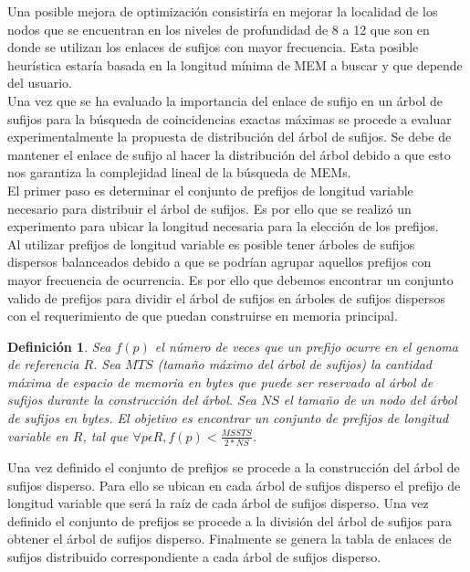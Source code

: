 \documentclass[12pt,a4paper]{article}
\newtheorem{mydef}{Definición}
\begin{document}
\indent
Una posible mejora de optimización consistiría en mejorar la localidad de los nodos que se encuentran en los niveles de profundidad de 8 a 12 que son en donde se utilizan los enlaces de sufijos con mayor frecuencia. Esta posible heurística estaría basada en la longitud mínima de MEM a buscar y que depende del usuario.\\
\indent
Una vez que se ha evaluado la importancia del enlace de sufijo en un árbol de sufijos para la búsqueda de coincidencias exactas máximas se procede a evaluar experimentalmente la propuesta de distribución del árbol de sufijos. Se debe de mantener el enlace de sufijo al hacer la distribución del árbol debido a que esto nos garantiza la complejidad lineal de la búsqueda de MEMs.\\
\indent
El primer paso es determinar el conjunto de prefijos de longitud variable necesario para distribuir el árbol de sufijos. Es por ello que se realizó un experimento para ubicar la longitud necesaria para la elección de los prefijos.\\
\indent 
Al utilizar prefijos de longitud variable es posible tener árboles de sufijos dispersos balanceados debido a que se podrían agrupar aquellos prefijos con mayor frecuencia
de ocurrencia. Es por ello que debemos encontrar un conjunto valido de prefijos para dividir el árbol de sufijos en árboles de sufijos dispersos con el requerimiento de que puedan construirse en memoria principal.\\
\begin{mydef}
Sea $f(p)$ el número de veces que un prefijo ocurre en el genoma de referencia $R$. Sea $MTS$ (tamaño máximo del árbol de sufijos) la cantidad
máxima de espacio de memoria en bytes que puede ser reservado al árbol de sufijos durante la construcción del árbol. 
Sea $NS$ el tamaño de un nodo del árbol de sufijos en bytes.
El objetivo es encontrar un conjunto de prefijos de longitud variable en $R$, tal que $\forall p \epsilon R, f(p)<\frac{MSSTS}{2*NS}$.
\end{mydef}
\indent
Una vez definido el conjunto de prefijos se procede a la construcción del árbol de sufijos disperso. Para ello se ubican en cada
árbol de sufijos disperso el prefijo de longitud variable que será la raíz de cada árbol de sufijos disperso. Una vez 
definido el conjunto de prefijos se procede a la división del árbol de sufijos para obtener el árbol de sufijos disperso. Finalmente se genera la tabla de enlaces de sufijos distribuido correspondiente a cada árbol de sufijos disperso.\\
\end{document}
